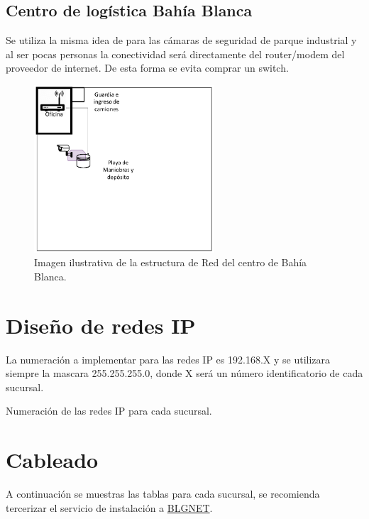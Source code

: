 \documentclass[11pt]{article}
\begin{document}
    \subsection{Centro de logística Bahía Blanca}
    Se utiliza la misma idea de para las cámaras de seguridad de parque industrial y al ser pocas personas la conectividad será directamente del router/modem 
    del proveedor de internet. De esta forma se evita comprar un switch. 
    
    \begin{figure}[H]
        \centering
        \includegraphics[width=0.6\textwidth]{Figure/Central_Bahia.png}
        \caption{Imagen ilustrativa de la estructura de Red del centro de Bahía Blanca.}
    \end{figure}

    \section{Diseño de redes IP}

    La numeración a implementar para las redes IP es 192.168.X y se utilizara siempre la mascara 255.255.255.0, donde X será un número identificatorio de cada sucursal.

    \begin{table}
        \centering
        
        \caption{Numeración de las redes IP para cada sucursal.}
    \end{table}


    \section{Cableado}

    A continuación se muestras las tablas para cada sucursal, se recomienda tercerizar el servicio de instalación a \href{https://blgnet.com.ar/home/index.php#contact}{BLGNET}.
\end{document}
